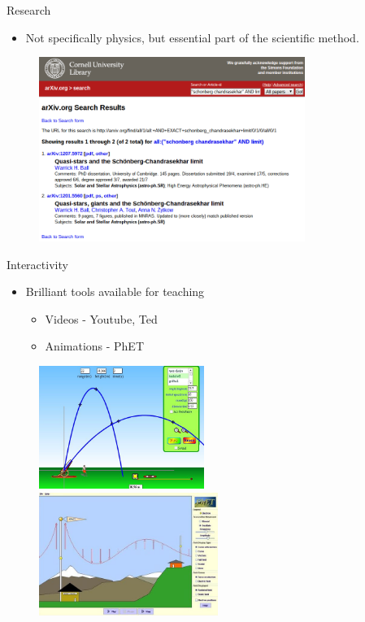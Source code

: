 \documentclass{beamer}
\begin{document}
\begin{frame}{Research}
    \begin{itemize}
        \item Not specifically physics, but essential part of the scientific method.
    \end{itemize}    
    \begin{figure}
        \includegraphics[height=6cm]{arxiv_search.png}
    \end{figure}
\end{frame}

\begin{frame}{Interactivity}
    \begin{itemize}
        \item Brilliant tools available for teaching
        \begin{itemize}
            \item Videos - Youtube, Ted
            \item Animations - PhET
        \end{itemize}
    \end{itemize}
    \begin{figure}
        \includegraphics[height=4cm]{phet-1.jpg}
         ~
        \includegraphics[height=4cm]{phet-2.jpg}
    \end{figure}
\end{frame}
\end{document}
